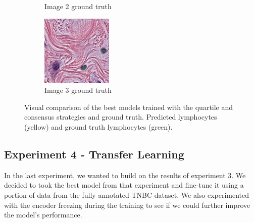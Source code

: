 \begin{figure}[H]
\begin{subfigure}[b]{0.32\textwidth}
    \caption{Image 2 ground truth}
  \end{subfigure}\hfill
  \begin{subfigure}[b]{0.32\textwidth}
    \centering
    \includegraphics[width=\linewidth]{assets/images/for_presentation/exp3-3-gt.png}
    \caption{Image 3 ground truth}
  \end{subfigure}
  \caption{Visual comparison of the best models trained with the quartile and consensus strategies and ground truth. Predicted lymphocytes (yellow) and ground truth lymphocytes (green).}
  \label{fig:exp3-results}
\end{figure}


\subsection{Experiment 4 - Transfer Learning}
In the last experiment, we wanted to build on the results of experiment 3. We decided to took the best model from that experiment and fine-tune it using a portion of data from the fully annotated TNBC dataset. We also experimented with the encoder freezing during the training to see if we could further improve the model's performance. 

